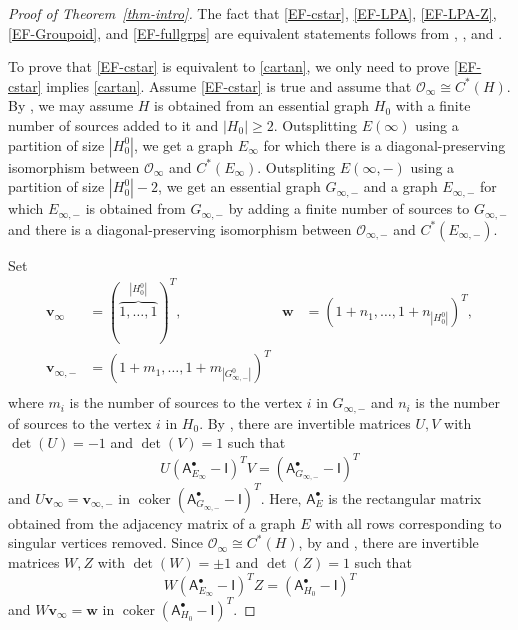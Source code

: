 \documentclass[11pt, letterpaper,final]{amsart}
\theoremstyle{definition}
\theoremstyle{remark}
\begin{document}
\begin{proof}[Proof of Theorem~\ref{thm-intro}]
The fact that \eqref{EF-cstar}, \eqref{EF-LPA}, \eqref{EF-LPA-Z}, \eqref{EF-Groupoid}, and \eqref{EF-fullgrps} are equivalent statements follows from \cite[Corollary~4.3 and Corollary~4.4]{ABHS}, \cite[Theorem~1]{TCadv}, and \cite[Theorem~D]{NO2019}.  

To prove that \eqref{EF-cstar} is equivalent to \eqref{cartan}, we only need to prove \eqref{EF-cstar} implies \eqref{cartan}. 
Assume \eqref{EF-cstar} is true and assume that $\mathcal{O}_\infty \cong C^*(H)$.  By \cite[Proposition~5.2.1]{ER-Refined}, we may assume $H$ is obtained from an essential graph $H_0$ with a finite number of sources added to it and $|H_0| \geq 2$.  Outsplitting $E(\infty)$ using a partition of size $|H_0^0|$, we get a graph $E_\infty$ for which there is a diagonal-preserving isomorphism between $\mathcal{O}_\infty$ and $C^*(E_\infty)$.  Outspliting $E(\infty, -)$ using a partition of size $|H_0^0|-2$, we get an essential graph $G_{\infty,-}$ and a graph $E_{\infty, -}$ for which $E_{\infty, -}$ is obtained from $G_{\infty,-}$ by adding a finite number of sources to $G_{\infty,-}$ and there is a diagonal-preserving isomorphism between $\mathcal{O}_{\infty, -}$ and $C^*(E_{\infty, -})$.   

Set 
\begin{align*}
\mathbf{v}_\infty &= (\overbrace{1, \ldots, 1}^{|H_0^0|})^T, &\mathbf{w} &=(1 +n_1, \ldots, 1 + n_{|H_0^0|})^T, \\
\mathbf{v}_{\infty, -} &=(1 +m_1, \ldots, 1 + m_{|G_{\infty,-}^0|})^T \\
\end{align*}
where $m_{i}$ is the number of sources to the vertex $i$ in $G_{\infty,-}$ and $n_i$ is the number of sources to the vertex $i$ in $H_0$.  By \cite[Lemma~7.1.6]{ER-Refined}, there are invertible matrices $U, V$ with $\det(U)=-1$ and $\det(V)=1$ such that 
\[
U( \mathsf{A}_{E_\infty}^\bullet - \mathsf{I})^T V = (\mathsf{A}_{G_{\infty,-}}^\bullet - \mathsf{I})^T
\]
and $U \mathbf{v}_{\infty}= \mathbf{v}_{\infty,-}$ in $\operatorname{coker}(\mathsf{A}_{G_{\infty,-}}^\bullet - \mathsf{I})^T $.  Here, $\mathsf{A}_E^\bullet$ is the rectangular matrix obtained from the adjacency matrix of a graph $E$ with all rows corresponding to singular vertices removed.  Since $\mathcal{O}_\infty \cong C^*(H)$, by \cite[Theorem~8.6]{ERRSDuke} and \cite[Lemma~7.1.6]{ER-Refined}, there are invertible matrices $W, Z$ with $\det(W)= \pm 1$ and $\det(Z) = 1$ such that 
\[
W(\mathsf{A}_{E_\infty}^\bullet - \mathsf{I})^T Z = (\mathsf{A}_{H_0}^\bullet - \mathsf{I})^T
\]
and $W \mathbf{v}_\infty = \mathbf{w}$ in $\operatorname{coker}(\mathsf{A}_{H_0}^\bullet - \mathsf{I})^T$.  


\end{proof}
\end{document}

